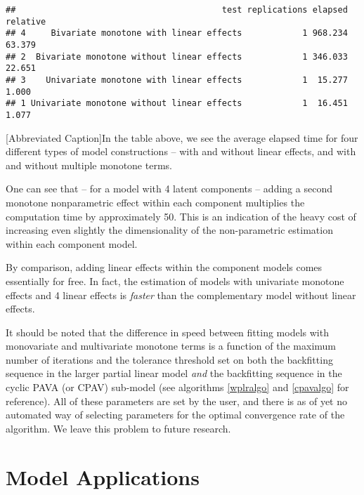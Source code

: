 \documentclass[10pt]{olplainarticle}\usepackage[]{graphicx}\usepackage[]{color}
\makeatletter
\newenvironment{kframe}{%
 \def\at@end@of@kframe{}%
 \ifinner\ifhmode%
  \def\at@end@of@kframe{\end{minipage}}%
  \begin{minipage}{\columnwidth}%
 \fi\fi%
 \def\FrameCommand##1{\hskip\@totalleftmargin \hskip-\fboxsep
 \colorbox{shadecolor}{##1}\hskip-\fboxsep
     \hskip-\linewidth \hskip-\@totalleftmargin \hskip\columnwidth}%
 \MakeFramed {\advance\hsize-\width
   \@totalleftmargin\z@ \linewidth\hsize
   \@setminipage}}%
 {\par\unskip\endMakeFramed%
 \at@end@of@kframe}
\newenvironment{knitrout}{}{} %
\makeatother
\begin{document}
\begin{minipage}{0.8\textwidth}
\begin{knitrout}
\color{fgcolor}\begin{kframe}
\begin{verbatim}
##                                         test replications elapsed relative
## 4     Bivariate monotone with linear effects            1 968.234   63.379
## 2  Bivariate monotone without linear effects            1 346.033   22.651
## 3    Univariate monotone with linear effects            1  15.277    1.000
## 1 Univariate monotone without linear effects            1  16.451    1.077
\end{verbatim}
\end{kframe}
\end{knitrout}
[Abbreviated Caption]{In the table above, we see the average elapsed time for four different types of model constructions -- with and without linear effects, and with and without multiple monotone terms.}
\end{minipage}

One can see that -- for a model with 4 latent components -- adding a second monotone nonparametric effect within each component multiplies the computation time by approximately 50. This is an indication of the heavy cost of increasing even slightly the dimensionality of the non-parametric estimation within each component model.

By comparison, adding linear effects within the component models comes essentially for free. In fact, the estimation of models with univariate monotone effects and 4 linear effects is \emph{faster} than the complementary model without linear effects. 

It should be noted that the difference in speed between fitting models with monovariate and multivariate monotone terms is a function of the maximum number of iterations and the tolerance threshold set on both the backfitting sequence in the larger partial linear model \emph{and} the backfitting sequence in the cyclic PAVA (or CPAV) sub-model (see algorithms \ref{wplralgo} and \ref{cpavalgo} for reference). All of these parameters are set by the user, and there is as of yet no automated way of selecting parameters for the optimal convergence rate of the algorithm. We leave this problem to future research.

\section{Model Applications}
\end{document}
